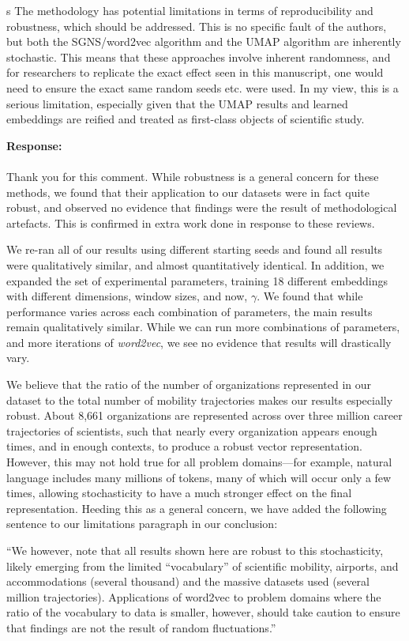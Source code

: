 \documentclass[12pt,a4paper]{article}
\newcommand{\response}[1]{{\noindent \textbf{Response:} \\ \\ \noindent #1}}
\newcommand{\rcomment}[1]{%
\vspace{10pt}
\begin{sectionbox}
s #1
\end{sectionbox}
}
\begin{document}
\rcomment{%
	The methodology has potential limitations in terms of reproducibility and robustness, which should be addressed. This is no specific fault of the authors, but both the SGNS/word2vec algorithm and the UMAP algorithm are inherently stochastic. This means that these approaches involve inherent randomness, and for researchers to replicate the exact effect seen in this manuscript, one would need to ensure the exact same random seeds etc. were used. In my view, this is a serious limitation, especially given that the UMAP results and learned embeddings are reified and treated as first-class objects of scientific study.
}

\response{Thank you for this comment. While robustness is a general concern for these methods, we found that their application to our datasets were in fact quite robust, and observed no evidence that findings were the result of methodological artefacts. This is confirmed in extra work done in response to these reviews.

	We re-ran all of our results using different starting seeds and found all results were qualitatively similar, and almost quantitatively identical.
	In addition, we expanded the set of experimental parameters, training 18 different embeddings with different dimensions, window sizes, and now, $\gamma$.
	We found that while performance varies across each combination of parameters, the main results remain qualitatively similar.
	While we can run more combinations of parameters, and more iterations of \textit{word2vec}, we see no evidence that results will drastically vary.

	We believe that the ratio of the number of organizations represented in our dataset to the total number of mobility trajectories makes our results especially robust.
	About 8,661 organizations are represented across over three million career trajectories of scientists, such that nearly every organization appears enough times, and in enough contexts, to produce a robust vector representation.
	However, this may not hold true for all problem domains—for example, natural language includes many millions of tokens, many of which will occur only a few times, allowing stochasticity to have a much stronger effect on the final representation.
	Heeding this as a general concern, we have added the following sentence to our limitations paragraph in our conclusion:

	“We however, note that all results shown here are robust to this stochasticity, likely emerging from the limited ``vocabulary'' of scientific mobility, airports, and accommodations (several thousand) and the massive datasets used (several million trajectories). Applications of word2vec to problem domains where the ratio of the vocabulary to data is smaller, however, should take caution to ensure that findings are not the result of random fluctuations.”

}
\end{document}
